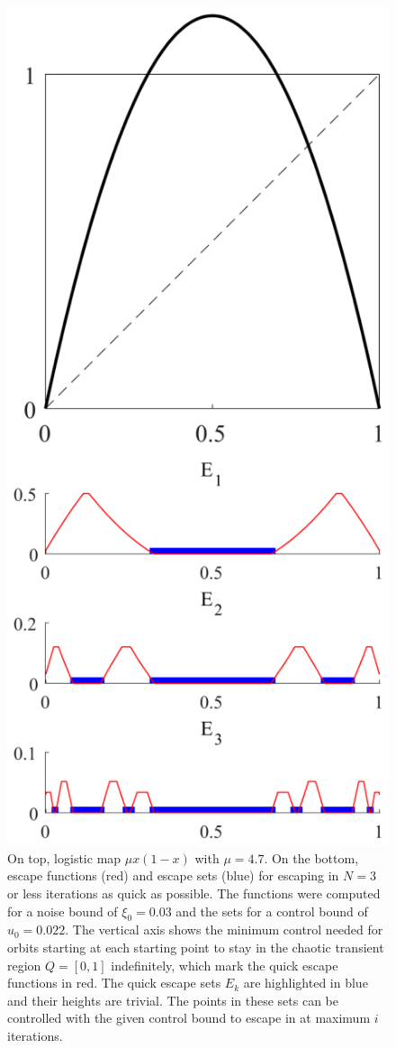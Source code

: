 \begin{figure}
    \centering
    \includegraphics[width=0.4\textheight]{Images/P1/EscapeSetsQuick.eps}
    \caption{On top, logistic map $\mu x(1-x)$ with $\mu = 4.7$. On the bottom, escape functions (red) and escape sets (blue) for escaping in $N=3$ or less iterations as quick as possible. The functions were computed for a noise bound of $\xi_0 = 0.03$ and the sets for a control bound of $u_0 = 0.022$. The vertical axis shows the minimum control needed for orbits starting at each starting point to stay in the chaotic transient region $Q = [0,1]$ indefinitely, which mark the quick escape functions in red. The quick escape sets $E_k$ are highlighted in blue and their heights are trivial. The points in these sets can be controlled with the given control bound to escape in at maximum $i$ iterations.   }
    \label{fig:EscapeSetsQuick}
\end{figure}

